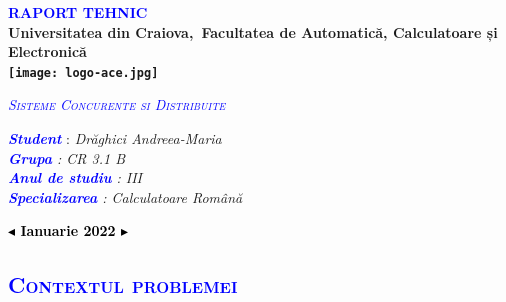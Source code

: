 \documentclass{article}
\begin{document}
\slshape
\normalsize
\upshape
\sffamily
\begin{titlepage}
\begin{center}
    \textcolor{blue}{\textsc{\huge\scshape\textbf{RAPORT TEHNIC }}}\\[1cm]
    \vspace{20mm}
    \textbf{Universitatea din Craiova,\ Facultatea de Automatică, Calculatoare și Electronică}\\
    \vspace{7mm}
    \textbf{\texttt{[image: logo-ace.jpg]}}
\end{center}
\vspace{3mm}
\begin{center}
\textcolor{blue}{\textsc{\huge\itshape{Sisteme Concurente si Distribuite}}}\\[1.5cm]
	    \vspace{10mm}
	\end{center}
	\begin{minipage}{1\textwidth}
			\Large
			  \textcolor{blue}{\itshape\textbf{Student}} : \itshape{Drăghici Andreea-Maria}\\[0.5cm] 
			  \textcolor{blue}{\textbf{Grupa}} : \itshape{CR 3.1 B}\\[0.5cm] 
			  \textcolor{blue}{\textbf{Anul de studiu}} : \itshape{III}\\[0.5cm] 
			  \textcolor{blue}{\itshape{}\textbf{Specializarea}} : \itshape{Calculatoare Română}\\[2cm]
			  \begin{center}
			      \centering\textcolor{black}{\textbf{$\blacktriangleleft$ Ianuarie 2022 $\blacktriangleright$}}
			  \end{center}
	\end{minipage}
\end{titlepage}
\tableofcontents
\newpage
	\begin{center}
	  \textcolor{blue}{\section{\bfseries\scshape\textcolor{blue}{Contextul problemei}}}
	   \vspace{3mm}
	\end{center}
\end{document}
